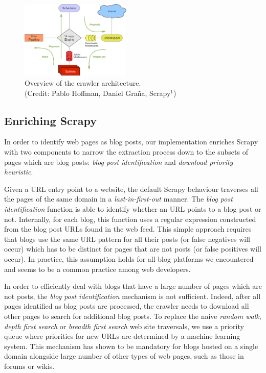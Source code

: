 \begin{figure}
  \capstart
  \centering
  \includegraphics[width=0.47\textwidth]{./img/scrapy_architecture.eps}
  \caption{Overview of the crawler architecture.\\(Credit: Pablo Hoffman, Daniel Graña, Scrapy$^1$)} %
  \label{scrapyarchitecture}
\end{figure}


\subsection{Enriching Scrapy}\label{enrichingscrapy}

In order to identify web pages as blog posts, our implementation enriches Scrapy with two components to narrow the extraction process down to the subsets of pages which are blog posts: \emph{blog post identification} and \emph{download priority heuristic}.

Given a URL entry point to a website, the default Scrapy behaviour traverses all the pages of the same domain in a \emph{last-in-first-out} manner. The \emph{blog post identification} function is able to identify whether an URL points to a blog post or not. Internally, for each blog, this function uses a regular expression constructed from the blog post URLs found in the web feed. This simple approach requires that blogs use the same URL pattern for all their posts (or false negatives will occur) which has to be distinct for pages that are not posts (or false positives will occur). In practice, this assumption holds for all blog platforms we encountered and seems to be a common practice among web developers.

In order to efficiently deal with blogs that have a large number of pages which are not posts, the \emph{blog post identification} mechanism is not sufficient. Indeed, after all pages identified as blog posts are processed, the crawler needs to download all other pages to search for additional blog posts. To replace the naive \emph{random walk}, \emph{depth first search} or \emph{breadth first search} web site traversals, we use a priority queue where priorities for new URLs are determined by a machine learning system. This mechanism has shown to be mandatory for blogs hosted on a single domain alongside large number of other types of web pages, such as those in forums or wikis.


